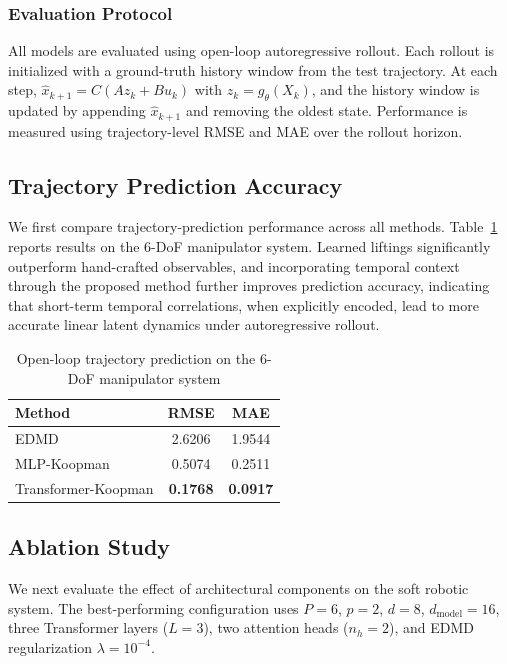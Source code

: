 \documentclass[journal]{IEEEtran}
\begin{document}
\subsubsection{Evaluation Protocol}
\label{sec:eval_protocol}

All models are evaluated using open-loop autoregressive rollout. Each rollout is initialized with a ground-truth history window from the test trajectory. At each step, $\hat{x}_{k+1} = C(A z_k + B u_k)$ with $z_k = g_\theta(X_k)$, and the history window is updated by appending $\hat{x}_{k+1}$ and removing the oldest state. Performance is measured using trajectory-level RMSE and MAE over the rollout horizon.

\subsection{Trajectory Prediction Accuracy}

We first compare trajectory-prediction performance across all methods. Table~\ref{tab:prediction_platform_a} reports results on the 6-DoF manipulator system. Learned liftings significantly outperform hand-crafted observables, and incorporating temporal context through the proposed method further improves prediction accuracy, indicating that short-term temporal correlations, when explicitly encoded, lead to more accurate linear latent dynamics under autoregressive rollout.

\begin{table}[!t]
\renewcommand{\arraystretch}{1.2}
\caption{Open-loop trajectory prediction on the 6-DoF manipulator system}
\label{tab:prediction_platform_a}
\centering
\begin{tabular}{lcc}
\toprule
Method & RMSE & MAE \\
\midrule
EDMD & 2.6206 & 1.9544 \\
MLP-Koopman & 0.5074 & 0.2511 \\
Transformer-Koopman & \textbf{0.1768} & \textbf{0.0917} \\
\bottomrule
\end{tabular}
\end{table}

\subsection{Ablation Study}

We next evaluate the effect of architectural components on the soft robotic system. The best-performing configuration uses $P=6$, $p=2$, $d=8$, $d_{\mathrm{model}}=16$, three Transformer layers ($L=3$), two attention heads ($n_h=2$), and EDMD regularization $\lambda=10^{-4}$.
\end{document}
